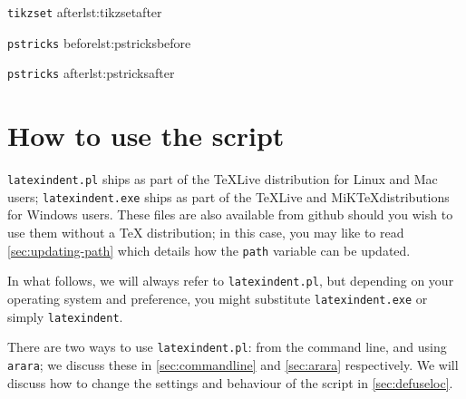 \documentclass[11pt]{article}
\newenvironment{sidebyside}{\begin{adjustwidth}{-3cm}{1cm}}{\end{adjustwidth}}
\begin{document}
\begin{sidebyside}
\begin{minipage}{.6\textwidth}
\begin{cmhlistings}[style=demo]{\lstinline!tikzset! after}{lst:tikzsetafter}
		\end{cmhlistings}
	\end{minipage}
	\begin{minipage}{.6\textwidth}
		\begin{cmhlistings}[style=demo]{\lstinline!pstricks! before}{lst:pstricksbefore}
\def\Picture#1{%
\def\stripH{#1}%
\begin{pspicture}[showgrid...
\psforeach{\row}{%
{{3,2.8,2.7,3,3.1}},%
{2.8,1,1.2,2,3},%
...
}{%
\expandafter...
}
\end{pspicture}}
		\end{cmhlistings}
	\end{minipage}%
	\begin{minipage}{.6\textwidth}
		\begin{cmhlistings}[style=demo]{\lstinline!pstricks! after}{lst:pstricksafter}
\def\Picture#1{%
	\def\stripH{#1}%
	\begin{pspicture}[showgrid...
		\psforeach{\row}{%
			{{3,2.8,2.7,3,3.1}},%
			{2.8,1,1.2,2,3},%
            ...
			}{%
			\expandafter...
		}
	\end{pspicture}}
		\end{cmhlistings}
	\end{minipage}
  \end{sidebyside}

\section{How to use the script}
\lstinline!latexindent.pl! ships as part of the \TeX Live distribution for
Linux and Mac users; \lstinline!latexindent.exe! ships as part of the \TeX Live
and MiK\TeX distributions for Windows users. These files are also available
from github \cite{latexindent-home} should you wish to use them without
a \TeX{} distribution; in this case, you may like to read \vref{sec:updating-path}
which details how the \lstinline!path! variable can be updated.

In what follows, we will always refer to \lstinline!latexindent.pl!, but depending on
your operating system and preference, you might substitute \lstinline!latexindent.exe! or
simply \lstinline!latexindent!.

There are two ways to use \lstinline!latexindent.pl!: from the command line,
and using \lstinline!arara!; we discuss these in \cref{sec:commandline} and
\cref{sec:arara} respectively. We will discuss how to change the settings and 
behaviour of the script in \vref{sec:defuseloc}.
\end{document}
